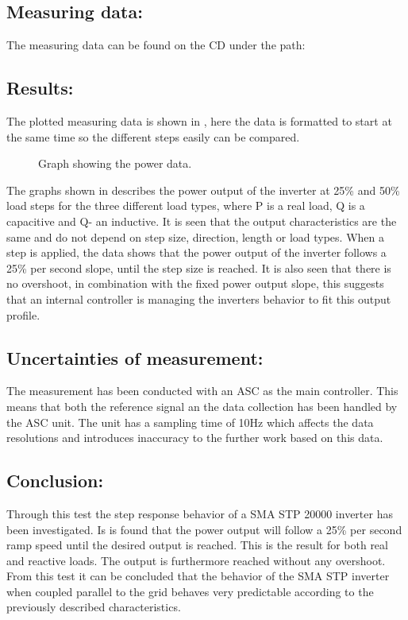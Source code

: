\subsection*{Measuring data:}
The measuring data can be found on the CD under the path: 


\subsection*{Results:}
The plotted measuring data is shown in , here the data is formatted to start at the same time so the different steps easily can be compared.

\begin{figure}[H]
\centering

\caption{Graph showing the power data.}\label{fig:inverter_data}
\end{figure}

The graphs shown in  describes the power output of the inverter at 25\% and 50\% load steps for the three different load types, where P is a real load, Q is a capacitive and Q- an inductive.  
It is seen that the output characteristics are the same and do not depend on step size, direction, length or load types. When a step is applied, the data shows that the power output of the inverter follows a 25\% per second slope, until the step size is reached. It is also seen that there is no overshoot, in combination with the fixed power output slope, this suggests that an internal controller is managing the inverters behavior to fit this output profile.     

\subsection*{Uncertainties of measurement:}
The measurement has been conducted with an ASC as the main controller. This means that both the reference signal an the data collection has been handled by the ASC unit. The unit has a sampling time of 10Hz which affects the data resolutions and introduces inaccuracy to the further work based on this data.    

\subsection*{Conclusion:}
Through this test the step response behavior of a SMA STP 20000 inverter has been investigated. Is is found that the power output will follow a 25\% per second ramp speed until the desired output is reached. This is the result for both real and reactive loads. The output is furthermore reached without any overshoot. 
From this test it can be concluded that the behavior of the SMA STP inverter when coupled parallel to the grid behaves very predictable according to the previously described characteristics.   